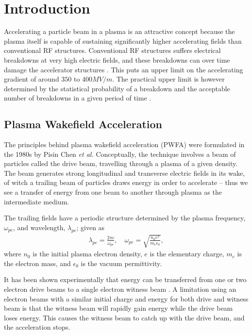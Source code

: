 %
%

\chapter{Introduction}
\label{Ch:Intro}

Accelerating a particle beam in a plasma is an attractive concept because the plasma itself is capable of sustaining
significantly higher accelerating fields than conventional RF structures. Conventional RF structures suffers electrical
breakdowns at very high electric fields, and these breakdowns can over time damage the accelerator structures
\cite{braun:2003}. This puts an upper limit on the accelerating gradient of around $350$ to $400\unit{MV/m}$. The
practical upper limit is however determined by the statistical probability of a breakdown and the acceptable number
of breakdowns in a given period of time \cite{pritzkau:2002}.

\section{Plasma Wakefield Acceleration}
\label{Int:PWFA}

The principles behind plasma wakefield acceleration (PWFA) were formulated in the 1980s by Pisin Chen \emph{et al.}
\cite{chen:1985} Conceptually, the technique involves a beam of particles called the drive beam, travelling through
a plasma of a given density. The beam generates strong longitudinal and transverse electric fields in its wake, of witch
a trailing beam of particles draws energy in order to accelerate -- thus we see a transfer of energy from one beam to
another through plasma as the intermediate medium.

The trailing fields have a periodic structure determined by the plasma frequency, $\omega_{pe}$, and wavelength,
$\lambda_{pe}$; given as
\begin{align}
    \lambda_{pe} = \frac{2\pi c}{\omega_{pe}}, \quad
    \omega_{pe}  = \sqrt{\frac{n_{0}e^{2}}{m_{e}\epsilon_{0}}}, \label{EQ:PWFA:L0W0}
\end{align}
where $n_{0}$ is the initial plasma electron density, $e$ is the elementary charge, $m_{e}$ is the electron mass, and
$\epsilon_{0}$ is the vacuum permittivity.

It has been shown experimentally that energy can be transferred from one or two electron drive beams to a single
electron witness beam \cite{rosenzweig:1988, blumenfeld:2007, kallos:2008}. A limitation using an electron beams with a
similar initial charge and energy for both drive and witness beam is that the witness beam will rapidly gain energy
while the drive beam loses energy. This causes the witness beam to catch up with the drive beam, and the acceleration
stops.

